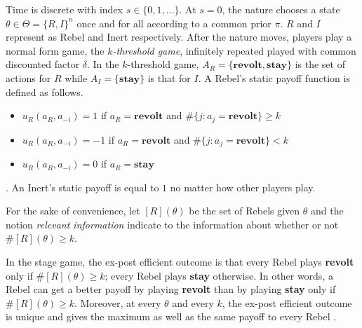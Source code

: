 \documentclass[12pt,letter]{article}
\theoremstyle{definition}
\theoremstyle{remark}
\theoremstyle{claim}
\begin{document}
Time is discrete with index $s\in\{0,1,...\}$. At $s=0$, the nature chooses a state $\theta\in \Theta=\{R,I\}^n$ once and for all according to a common prior $\pi$. $R$ and $I$ represent as Rebel and Inert respectively. After the nature moves, players play a normal form game, the \textit{$k$-threshold game}, infinitely repeated played with common discounted factor $\delta$. In the $k$-threshold game, $A_R=\{\textbf{revolt}, \textbf{stay}\}$ is the set of actions for $R$ while $A_I=\{\textbf{stay}\}$ is that for $I$. A Rebel's static payoff function is defined as follows. 
\begin{itemize}
\item $u_{R}(a_{R},a_{-i})=1$ if $a_{R}=\textbf{revolt}$ and $\#\{j:a_{j}=\textbf{revolt}\}\geq k$
\item $u_{R}(a_{R},a_{-i})=-1$ if $a_{R}=\textbf{revolt}$ and $\#\{j:a_{j}=\textbf{revolt}\}< k$
\item $u_{R}(a_{R},a_{-i})=0$ if $a_{R}=\textbf{stay}$
\end{itemize}
. An Inert's static payoff is equal to $1$ no matter how other players play. 

For the sake of convenience, let $[R](\theta)$ be the set of Rebels given $\theta$ and the notion \textit{relevant information} indicate to the information about whether or not $\#[R](\theta)\geq k$.

In the stage game, the ex-post efficient outcome is that every Rebel plays \textbf{revolt} only if $\#[R](\theta)\geq k$; every Rebel plays \textbf{stay} otherwise. In other words, a Rebel can get a better payoff by playing \textbf{revolt} than by playing \textbf{stay} only if $\#[R](\theta)\geq k$. Moreover, at every $\theta$ and every $k$, the ex-post efficient outcome is unique and gives the maximum as well as the same payoff to every Rebel . 
\end{document}
